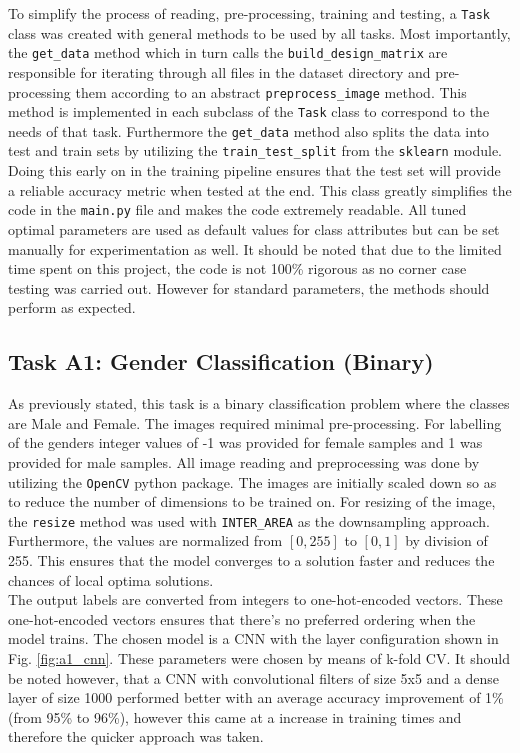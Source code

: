 \documentclass{article}
\begin{document}
	To simplify the process of reading, pre-processing, training and testing, a {\tt Task} class was created with general methods to be used by all tasks. Most importantly, the {\tt get\_data} method which in turn calls the {\tt build\_design\_matrix} are responsible for iterating through all files in the dataset directory and pre-processing them according to an abstract {\tt preprocess\_image} method. This method is implemented in each subclass of the {\tt Task} class to correspond to the needs of that task. Furthermore the {\tt get\_data} method also splits the data into test and train sets by utilizing the {\tt train\_test\_split} from the {\tt sklearn} module. Doing this early on in the training pipeline ensures that the test set will provide a reliable accuracy metric when tested at the end. This class greatly simplifies the code in the {\tt main.py} file and makes the code extremely readable. All tuned optimal parameters are used as default values for class attributes but can be set manually for experimentation as well. It should be noted that due to the limited time spent on this project, the code is not 100\% rigorous as no corner case testing was carried out. However for standard parameters, the methods should perform as expected. 
	
    \subsection{Task A1: Gender Classification (Binary)}
    \label{sec:implement_A1}
    
    	As previously stated, this task is a binary classification problem where the classes are Male and Female. The images required minimal pre-processing. For labelling of the genders integer values of -1 was provided for female samples and 1 was provided for male samples. All image reading and preprocessing was done by utilizing the {\tt OpenCV} python package. The images are initially scaled down so as to reduce the number of dimensions to be trained on. For resizing of the image, the {\tt resize} method was used with {\tt INTER\_AREA} as the downsampling approach. Furthermore, the values are normalized from $[0, 255]$ to $[0, 1]$ by division of 255. This ensures that the model converges to a solution faster and reduces the chances of local optima solutions.
    	\\
    	
    	The output labels are converted from integers to one-hot-encoded vectors. These one-hot-encoded vectors ensures that there's no preferred ordering when the model trains. The chosen model is a CNN with the layer configuration shown in Fig. \ref{fig:a1_cnn}. These parameters were chosen by means of k-fold CV. It should be noted however, that a CNN with convolutional filters of size 5x5 and a dense layer of size 1000 performed better with an average accuracy improvement of 1\% (from 95\% to 96\%), however this came at a increase in training times and therefore the quicker approach was taken. 
    	\\
    	
\end{document}
